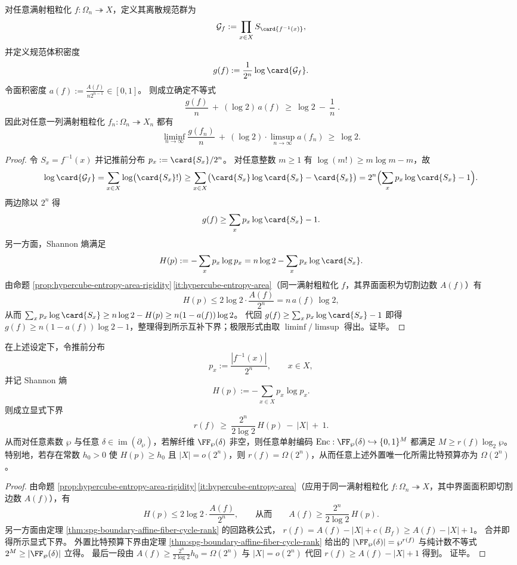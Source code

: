 \begin{theorem}[规范体积密度与面积密度的互补下界]\label{thm:spg-gauge-volume-area-complementarity}
对任意满射粗粒化 \(f:\Omega_n\twoheadrightarrow X\)，定义其离散规范群为
\[
\mathcal G_f:=\prod_{x\in X} S_{\card{f^{-1}(x)}},
\]
并定义规范体积密度
\[
g(f):=\frac{1}{2^n}\log\card{\mathcal G_f}.
\]
令面积密度 \(a(f):=\frac{A(f)}{n2^{n-1}}\in[0,1]\)。
则成立确定不等式
\[
\boxed{\;
\frac{g(f)}{n}\ +\ (\log 2)\,a(f)\ \ge\ \log 2\ -\ \frac{1}{n}\; }.
\]
因此对任意一列满射粗粒化 \(f_n:\Omega_n\twoheadrightarrow X_n\) 都有
\[
\liminf_{n\to\infty}\frac{g(f_n)}{n}\ +\ (\log 2)\cdot \limsup_{n\to\infty}a(f_n)\ \ge\ \log 2.
\]
\end{theorem}
\begin{proof}
令 \(S_x=f^{-1}(x)\) 并记推前分布 \(p_x:=\card{S_x}/2^n\)。
对任意整数 \(m\ge 1\) 有 \(\log(m!)\ge m\log m-m\)，故
\[
\log\card{\mathcal G_f}
=\sum_{x\in X}\log\bigl(\card{S_x}!\bigr)
\ge \sum_{x\in X}\bigl(\card{S_x}\log\card{S_x}-\card{S_x}\bigr)
=2^n\Bigl(\sum_x p_x\log\card{S_x}-1\Bigr).
\]
两边除以 \(2^n\) 得
\[
g(f)\ge \sum_x p_x\log\card{S_x}-1.
\]
另一方面，Shannon 熵满足
\[
H(p):=-\sum_x p_x\log p_x
=n\log 2-\sum_x p_x\log\card{S_x}.
\]
由命题 \ref{prop:hypercube-entropy-area-rigidity}\,\ref{it:hypercube-entropy-area}（同一满射粗粒化 \(f\)，其界面面积为切割边数 \(A(f)\)）有
\[
H(p)\le 2\log 2\cdot \frac{A(f)}{2^n}=n\,a(f)\,\log 2,
\]
从而
\(
\sum_x p_x\log\card{S_x}\ge n\log 2-H(p)\ge n(1-a(f))\log 2
\)。
代回 \(g(f)\ge \sum_x p_x\log\card{S_x}-1\) 即得
\(
g(f)\ge n(1-a(f))\log 2-1
\)，整理得到所示互补下界；极限形式由取 \(\liminf/\limsup\) 得出。证毕。
\end{proof}

\begin{corollary}[推前熵的非退化性强迫回路秩的指数下界]\label{cor:spg-boundary-cycle-rank-from-entropy}
在上述设定下，令推前分布
\[
p_x:=\frac{|f^{-1}(x)|}{2^n},\qquad x\in X,
\]
并记 Shannon 熵
\[
H(p):=-\sum_{x\in X}p_x\log p_x.
\]
则成立显式下界
\[
\boxed{\;
r(f)\ \ge\ \frac{2^n}{2\log 2}\,H(p)\ -\ |X|\ +\ 1.\;}
\]
从而对任意素数 \(\wp\) 与任意 \(\delta\in \operatorname{im}(\partial_{\wp})\)，若解纤维 \(\FF_{\wp}(\delta)\) 非空，则任意单射编码
\(
\mathrm{Enc}:\FF_{\wp}(\delta)\hookrightarrow\{0,1\}^M
\)
都满足 \(M\ge r(f)\log_2 \wp\)。
特别地，若存在常数 \(h_0>0\) 使 \(H(p)\ge h_0\) 且 \(|X|=o(2^n)\)，则 \(r(f)=\Omega(2^n)\)，从而任意上述外置唯一化所需比特预算亦为 \(\Omega(2^n)\)。
\end{corollary}
\begin{proof}
由命题 \ref{prop:hypercube-entropy-area-rigidity}\,\ref{it:hypercube-entropy-area}（应用于同一满射粗粒化 \(f:\Omega_n\twoheadrightarrow X\)，其中界面面积即切割边数 \(A(f)\)），有
\[
H(p)\le 2\log 2\cdot \frac{A(f)}{2^n},
\qquad\text{从而}\qquad
A(f)\ge \frac{2^n}{2\log 2}\,H(p).
\]
另一方面由定理 \ref{thm:spg-boundary-affine-fiber-cycle-rank} 的回路秩公式，
\(
r(f)=A(f)-|X|+c(B_f)\ge A(f)-|X|+1
\)。
合并即得所示显式下界。
外置比特预算下界由定理 \ref{thm:spg-boundary-affine-fiber-cycle-rank} 给出的 \(|\FF_{\wp}(\delta)|=\wp^{r(f)}\) 与纯计数不等式 \(2^M\ge |\FF_{\wp}(\delta)|\) 立得。
最后一段由 \(A(f)\ge \frac{2^n}{2\log 2}h_0=\Omega(2^n)\) 与 \(|X|=o(2^n)\) 代回 \(r(f)\ge A(f)-|X|+1\) 得到。
证毕。
\end{proof}

